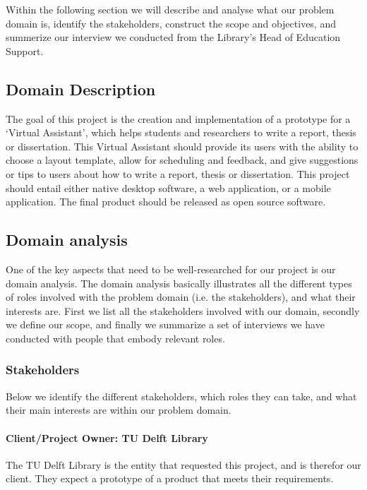 Within the following section we will describe and analyse what our problem domain is, identify the stakeholders, construct the scope and objectives, and summerize our interview we conducted from the Library's Head of Education Support.

\subsection{Domain Description} %
\label{sub:problem_description}

The goal of this project is the creation and implementation of a prototype for a `Virtual Assistant', which helps students and researchers to write a report, thesis or dissertation. This Virtual Assistant should provide its users with the ability to choose a layout template, allow for scheduling and feedback, and give suggestions or tips to users about how to write a report, thesis or dissertation.
This project should entail either native desktop software, a web application, or a mobile application. The final product should be released as open source software.

\subsection{Domain analysis} %

One of the key aspects that need to be well-researched for our project is our domain analysis. The domain analysis basically illustrates all the different types of roles involved with the problem domain (i.e. the stakeholders), and what their interests are. First we list all the stakeholders involved with our domain, secondly we define our scope, and finally we summarize a set of interviews we have conducted with people that embody relevant roles.

\subsubsection{Stakeholders} %

Below we identify the different stakeholders, which roles they can take, and what their main interests are within our problem domain.

\paragraph{Client/Project Owner: TU Delft Library} The TU Delft Library is the entity that requested this project, and is therefor our client. They expect a prototype of a product that meets their requirements.

